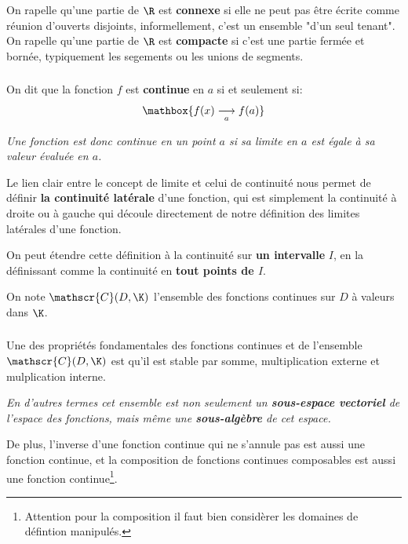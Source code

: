\chapter*{} %

On rapelle qu'une partie de \(\R\) est \textbf{connexe} si elle ne peut pas être écrite comme réunion d'ouverts disjoints, informellement, c'est un ensemble "d'un seul tenant".\+
On rapelle qu'une partie de \(\R\) est \textbf{compacte} si c'est une partie fermée et bornée, typiquement les segements ou les unions de segments.

\subsection*{}

On dit que la fonction \(f\) est \textbf{continue} en \(a\) si et seulement si:
\[
   \mathbox{f(x) \underset{a}{\longrightarrow} f(a)}   
\]
\begin{center}
   \textit{
      Une fonction est donc continue en un point \(a\) si sa limite en \(a\) est égale à sa valeur évaluée en \(a\).
   }
\end{center}
Le lien clair entre le concept de limite et celui de continuité nous permet de définir \textbf{la continuité latérale} d'une fonction, qui est simplement la continuité à droite ou à gauche qui découle directement de notre définition des limites latérales d'une fonction.\<

On peut étendre cette définition à la continuité sur \textbf{un intervalle} \(I\), en la définissant comme la continuité en \textbf{tout points de \(I\)}.\+

On note \(\mathscr{C}(D, \K)\) l'ensemble des fonctions continues sur \(D\) à valeurs dans \(\K\).

\subsection*{}

Une des propriétés fondamentales des fonctions continues et de l'ensemble \(\mathscr{C}(D, \K)\) est qu'il est stable par somme, multiplication externe et mulplication interne.
\begin{center}
   \textit{
      En d'autres termes cet ensemble est non seulement un \textbf{sous-espace vectoriel} de l'espace des fonctions, mais même une \textbf{sous-algèbre} de cet espace.
   }
\end{center}
De plus, l'inverse d'une fonction continue qui ne s'annule pas est aussi une fonction continue, et la composition de fonctions continues composables est aussi une fonction continue\footnote[1]{
   Attention pour la composition il faut bien considèrer les domaines de défintion manipulés.}.

